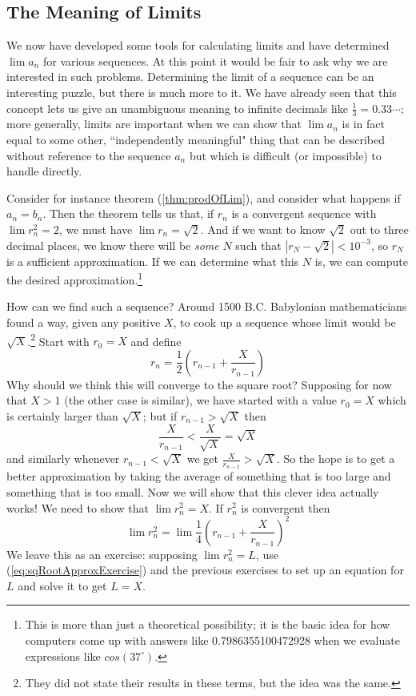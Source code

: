 \subsection{The Meaning of Limits}\label{sec:MeaningOfLimits}
We now have developed some tools for calculating limits and have determined $\lim a_n$ for various sequences. At this point it would be fair to ask why we are interested in such problems. Determining the limit of a sequence can be an interesting puzzle, but there is much more to it. We have already seen that this concept lets us give an unambiguous meaning to infinite decimals like $\frac{1}{3}=0.33\cdots$; more generally, limits are important when we can show that $\lim a_n$ is in fact equal to some other, ``independently meaningful" thing that can be described without reference to the sequence $a_n$ but which is difficult (or impossible) to handle directly. 

Consider for instance theorem (\ref{thm:prodOfLim}), and consider what happens if $a_n = b_n$. Then the theorem tells us that, if $r_n$ is  a convergent sequence with $\lim r_n^2 = 2$, we must have $\lim r_n = \sqrt{2}$. And if we want to know $\sqrt{2}$ out to three decimal places, we know there will be \emph{some} $N$ such that $|r_N - \sqrt{2}| < 10^{-3}$, so $r_N$ is a sufficient approximation. If we can determine what this $N$ is, we can compute the desired approximation.\footnote{This is more than just a theoretical possibility; it is the basic idea for how computers come up with answers like 0.7986355100472928 when we evaluate expressions like $cos(37^\circ)$.}

How can we find such a sequence? Around 1500 B.C. Babylonian mathematicians found a way, given any positive $X$, to cook up a sequence whose limit would be $\sqrt{X}$.\footnote{They did not state their results in these terms, but the idea was the same.} Start with $r_0 = X$ and define
\begin{equation}\label{eq:sqRootApprox}
r_n = \frac{1}{2}(r_{n-1} + \frac{X}{r_{n-1}})
\end{equation}
Why should we think this will converge to the square root? Supposing for now that $X>1$ (the other case is similar), we have started with a value  $r_0 = X$ which is certainly larger than $\sqrt{X}$; but if $r_{n-1} > \sqrt{X}$ then
\[
\frac{X}{r_{n-1}} < \frac{X}{\sqrt{X}} = \sqrt{X}
\]
and similarly whenever $r_{n-1} < \sqrt{X}$ we get $\frac{X}{r_{n-1}} > \sqrt{X}$.
So the hope is to get a better approximation by taking the average of something that is too large and something that is too small.
Now we will show that this clever idea actually works!  We need to show that $\lim r_n^2 = X$. If $r_n^2$ is convergent then
\begin{equation}\label{eq:sqRootApproxExercise}
\lim r_n^2 = \lim \frac{1}{4}(r_{n-1} + \frac{X}{r_{n-1}})^2
\end{equation}
We leave this as an exercise: supposing $\lim r_n^2 = L$, use (\ref{eq:sqRootApproxExercise}) and the previous exercises to set up an equation for $L$ and solve it to get $L=X$.


